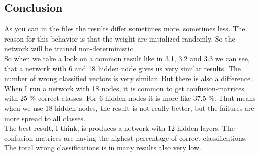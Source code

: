 \documentclass[10pt,a4paper]{article}
\begin{document}
	\subsection{Conclusion}						%
	As you can in the files the results differ sometimes more, sometimes less. The reason for this behavior is that the weight are initialized randomly. So the network will be trained non-deterministic. \\
	So when we take a look on a common result like in 3.1, 3.2 and 3.3 we can see, that a network with 6 and 18 hidden node gives us very similar results. The number of wrong classified vectors is very similar. But there is also a difference. When I run a network with 18 nodes, it is common to get confusion-matrices with 25 \% correct classes. For 6 hidden nodes it is more like 37.5 \%. That means when we use 18 hidden nodes, the result is not really better, but the failures are more spread to all classes. \\
	The best result, I think, is produces a network with 12 hidden layers. The confusion matrices are having the highest percentage of correct classifications. The total wrong classifications is in many results also very low.   
\end{document}
